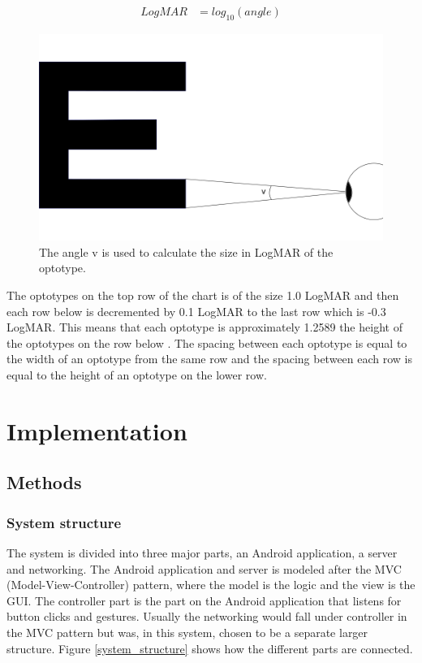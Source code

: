 \documentclass[12pt,a4paper,notitlepage]{report}
\begin{document}
\begin{equation}
	\begin{split}
  		LogMAR & = log_{10}(angle)
  	\end{split}
  	\label{eq:logmar}
\end{equation}

\begin{figure}[h]
\centering
\includegraphics[width=120mm]{images/logmar_calculation.png}
\caption{The angle v is used to calculate the size in LogMAR of the optotype.\label{fig:logmar_calculation}}
\end{figure} 

The optotypes on the top row of the chart is of the size 1.0 LogMAR and then each row below is decremented by 0.1 LogMAR to the last row which is -0.3 LogMAR. This means that each optotype is approximately 1.2589 the height of the optotypes on the row below \cite{Ferris}. The spacing between each optotype is equal to the width of an optotype from the same row and the spacing between each row is equal to the height of an optotype on the lower row.

\chapter{Implementation}
\section{Methods}
\subsection{System structure}
The system is divided into three major parts, an Android application, a server and networking. The Android application and server is modeled after the MVC (Model-View-Controller) pattern, where the model is the logic and the view is the GUI. The controller part is the part on the Android application that listens for button clicks and gestures. Usually the networking would fall under controller in the MVC pattern but was, in this system, chosen to be a separate larger structure. Figure \ref{system_structure} shows how the different parts are connected.
\end{document}
